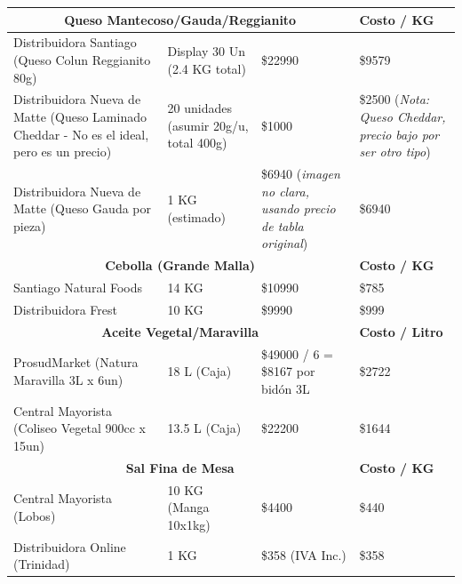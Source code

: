 \documentclass[12pt]{article}
\begin{document}
\begin{longtable}{|| m{4cm} | m{2.5cm} | m{3cm} | m{3cm} ||}
        \multicolumn{3}{||c|}{\textbf{Queso Mantecoso/Gauda/Reggianito}} & \textbf{Costo / KG} \\ [0.5ex] \hline \hline
        Distribuidora Santiago (Queso Colun Reggianito 80g) & Display 30 Un (2.4 KG total) & \$\num{22990} & \$\num{9579} \\ \hline
        Distribuidora Nueva de Matte (Queso Laminado Cheddar - No es el ideal, pero es un precio) & 20 unidades (asumir 20g/u, total 400g) & \$\num{1000} & \$\num{2500} \newline (\textit{Nota: Queso Cheddar, precio bajo por ser otro tipo}) \\ 
        Distribuidora Nueva de Matte (Queso Gauda por pieza) & 1 KG (estimado) & \$\num{6940} (\textit{imagen no clara, usando precio de tabla original}) & \$\num{6940} \\ [1ex] \hline \hline

        \multicolumn{3}{||c|}{\textbf{Cebolla (Grande Malla)}} & \textbf{Costo / KG} \\ [0.5ex] \hline \hline
        Santiago Natural Foods & 14 KG & \$\num{10990} & \$\num{785} \\ \hline
        Distribuidora Frest & 10 KG & \$\num{9990} & \$\num{999} \\ [1ex] \hline \hline

        \multicolumn{3}{||c|}{\textbf{Aceite Vegetal/Maravilla}} & \textbf{Costo / Litro} \\ [0.5ex] \hline \hline
        ProsudMarket (Natura Maravilla 3L x 6un) & 18 L (Caja) & \$\num{49000} / 6 = \$\num{8167} por bidón 3L & \$\num{2722} \\ \hline %
        Central Mayorista (Coliseo Vegetal 900cc x 15un) & 13.5 L (Caja) & \$\num{22200} & \$\num{1644} \\ [1ex] \hline \hline
        
        \multicolumn{3}{||c|}{\textbf{Sal Fina de Mesa}} & \textbf{Costo / KG} \\ [0.5ex] \hline \hline
        Central Mayorista (Lobos) & 10 KG (Manga 10x1kg) & \$\num{4400} & \$\num{440} \\ \hline
        Distribuidora Online (Trinidad) & 1 KG & \$\num{358} (IVA Inc.) & \$\num{358} \\ [1ex] \hline \hline


\end{longtable}
\end{document}
